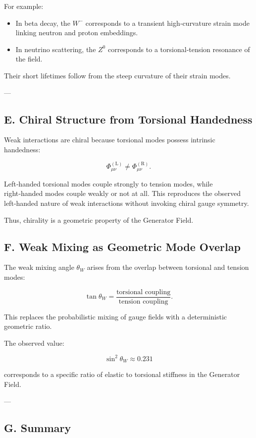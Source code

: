 \documentclass[reprint,amsmath,amssymb,aps,prl,floatfix]{revtex4-2}
\begin{document}
For example:
\begin{itemize}
\item In beta decay, the \(W^-\) corresponds to a transient high‑curvature strain mode linking neutron and proton embeddings.  
\item In neutrino scattering, the \(Z^0\) corresponds to a torsional‑tension resonance of the field.
\end{itemize}

Their short lifetimes follow from the steep curvature of their strain modes.

---

\subsection{E. Chiral Structure from Torsional Handedness}

Weak interactions are chiral because torsional modes possess intrinsic handedness:

\[
\Phi_{\mu\nu}^{(\mathrm{L})}
\neq
\Phi_{\mu\nu}^{(\mathrm{R})}.
\]

Left‑handed torsional modes couple strongly to tension modes, while right‑handed modes couple weakly or not at all. This reproduces the observed left‑handed nature of weak interactions without invoking chiral gauge symmetry.

Thus, chirality is a geometric property of the Generator Field.

\subsection{F. Weak Mixing as Geometric Mode Overlap}

The weak mixing angle \(\theta_W\) arises from the overlap between torsional and tension modes:

\[
\tan\theta_W
=
\frac{\text{torsional coupling}}{\text{tension coupling}}.
\]

This replaces the probabilistic mixing of gauge fields with a deterministic geometric ratio.

The observed value:

\[
\sin^2\theta_W \approx 0.231
\]

corresponds to a specific ratio of elastic to torsional stiffness in the Generator Field.

---

\subsection{G. Summary}
\end{document}

